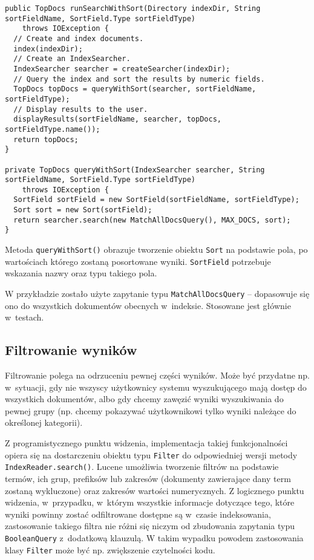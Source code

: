 \begin{lstlisting}
public TopDocs runSearchWithSort(Directory indexDir, String sortFieldName, SortField.Type sortFieldType)
    throws IOException {
  // Create and index documents.  
  index(indexDir);
  // Create an IndexSearcher.
  IndexSearcher searcher = createSearcher(indexDir);
  // Query the index and sort the results by numeric fields.
  TopDocs topDocs = queryWithSort(searcher, sortFieldName, sortFieldType);
  // Display results to the user.
  displayResults(sortFieldName, searcher, topDocs, sortFieldType.name());
  return topDocs;
}

private TopDocs queryWithSort(IndexSearcher searcher, String sortFieldName, SortField.Type sortFieldType)
    throws IOException {
  SortField sortField = new SortField(sortFieldName, sortFieldType);
  Sort sort = new Sort(sortField);
  return searcher.search(new MatchAllDocsQuery(), MAX_DOCS, sort);
}
\end{lstlisting}

Metoda \texttt{queryWithSort()} obrazuje tworzenie obiektu \texttt{Sort} na podstawie pola, po wartościach którego zostaną posortowane wyniki. \texttt{SortField} potrzebuje wskazania nazwy oraz typu takiego pola. 

W przykładzie zostało użyte zapytanie typu \texttt{MatchAllDocsQuery} -- dopasowuje się ono do wszystkich dokumentów obecnych w~indeksie. Stosowane jest głównie w~testach.

\subsection{Filtrowanie wyników}

Filtrowanie polega na odrzuceniu pewnej części wyników. Może być przydatne np. w~sytuacji, gdy nie wszyscy użytkownicy systemu wyszukującego mają dostęp do wszystkich dokumentów, albo gdy chcemy zawęzić wyniki wyszukiwania do pewnej grupy (np. chcemy pokazywać użytkownikowi tylko wyniki należące do określonej kategorii).

Z programistycznego punktu widzenia, implementacja takiej funkcjonalności opiera się na dostarczeniu obiektu typu \texttt{Filter} do odpowiedniej wersji metody \texttt{IndexReader.search()}. Lucene umożliwia tworzenie filtrów na podstawie termów, ich grup, prefiksów lub zakresów (dokumenty zawierające dany term zostaną wykluczone) oraz zakresów wartości numerycznych. Z logicznego punktu widzenia, w~przypadku, w~którym wszystkie informacje dotyczące tego, które wyniki powinny zostać odfiltrowane dostępne są w~czasie indeksowania, zastosowanie takiego filtra nie różni się niczym od zbudowania zapytania typu \texttt{BooleanQuery} z~dodatkową klauzulą. W takim wypadku powodem zastosowania klasy \texttt{Filter} może być np. zwiększenie czytelności kodu. 

